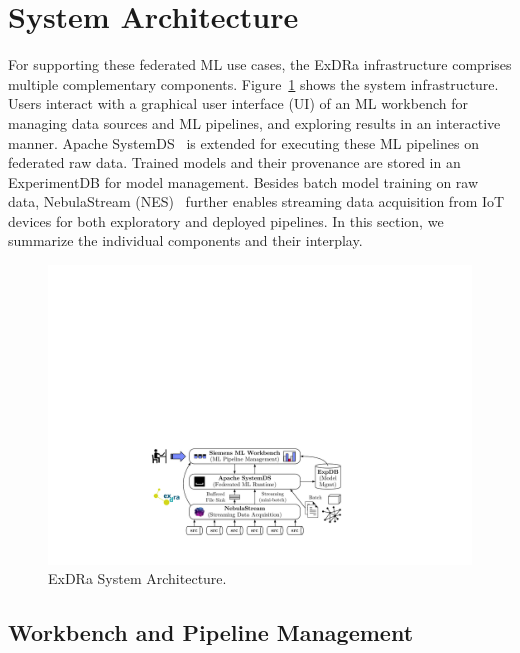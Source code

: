 \documentclass[sigconf,screen]{acmart}
\begin{document}
\section{System Architecture}
\label{sec:sysarch}

For supporting these federated ML use cases, the ExDRa infrastructure comprises multiple complementary components. Figure~\ref{fig:sysarch} shows the  system infrastructure. Users interact with a graphical user interface (UI) of an ML workbench for managing data sources and ML pipelines, and exploring results in an interactive manner. Apache SystemDS~\cite{BoehmADGIKLPR20} is extended for executing these ML pipelines on federated raw data. Trained models and their provenance are stored in an ExperimentDB for model management. Besides batch model training on raw data, NebulaStream (NES)~\cite{ZeuchCMGGGBTM20} further enables streaming data acquisition from IoT devices for both exploratory and deployed pipelines. In this section, we summarize the individual components and their interplay.

\begin{figure}[!t]
	\centering
	\includegraphics[scale=0.43]{figures/fig01}
	\vspace{-0.25cm}
	\caption{\label{fig:sysarch}ExDRa System Architecture.}
\end{figure}

\subsection{Workbench and Pipeline Management}
\label{sec:demo}
\end{document}
